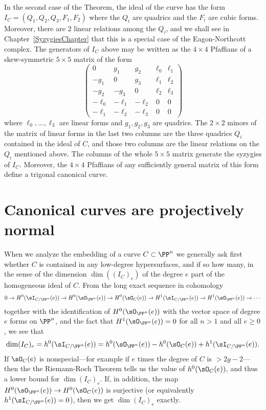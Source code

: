 \begin{fact}
In the second case of the Theorem, the ideal of the curve has the form $I_C = (Q_1, Q_2, Q_3, F_1, F_2)$ 
where the $Q_i$ are quadrics and the $F_i$ are cubic forms. Moreover, there are 2 linear relations among the
$Q_i$, and we shall see in Chapter~\ref{SyzygiesChapter} that this is a special case of the Eagon-Northcott
complex. The generators of $I_C$ above may be written as the $4\times 4$ Pfaffians
of a skew-symmetric $5\times 5$ matrix of the form
$$
\begin{pmatrix}
0&g_1&g_2&\ell_0&\ell_1\\
-g_1&0&g_3&\ell_1&\ell_2\\
-g_2&-g_3&0 &\ell_2&\ell_3\\
-\ell_0&-\ell_1&-\ell_2&0&0\\
-\ell_1&-\ell_2&-\ell_3&0&0
\end{pmatrix}
$$
where $\ell_0,\dots,\ell_3$ are linear forms and $g_1, g_2, g_3$ are quadrics. The
 $2\times 2$
minors of the matrix of linear forms in the last two columns are the three quadrics $Q_i$ contained in the ideal
of $C$, and those two columns are the linear relations on the $Q_i$ mentioned above.
The columns of the whole $5\times 5$ matrix generate the syzygies of $I_C$. Moreover, the
$4\times 4$ Pfaffians of any sufficiently general matrix of this form define a trigonal canonical curve.
\end{fact}


\section{Canonical curves are projectively normal}\label{Noether theorem section}

When we analyze the embedding of a curve $C\subset \PP^n$ we generally ask first whether $C$ is contained in any low-degree
hypersurfaces, and if so how many, in the sense of the dimension $\dim((I_C)_e)$ of the degree $e$ part of the homogeneous ideal of $C$.
From the long exact sequence in cohomology
$$
0\to H^0(\sI_{C/\PP^n}(e)) \to H^0(\sO_{\PP^n}(e)) \to H^0(\sO_C(e)) \to H^1(\sI_{C/\PP^n}(e)) \to H^1(\sO_{\PP^n}(e)) \to\cdots
$$
together with the identification of $H^0(\sO_{\PP^n}(e))$ with the vector space of degree $e$ forms on $\PP^n$, and  the fact that
 $H^1(\sO_{\PP^n}(e)) = 0$ for all $n>1$ and all $e\geq 0$, we see that
 $$
 \dim (I_C)_e = h^0(\sI_{C/\PP^n}(e)) = h^0(\sO_{\PP^n}(e)) - h^0(\sO_C(e)) + h^1(\sI_{C/\PP^n}(e)).
$$
If $\sO_C(e)$ is nonspecial---for example if $e$ times the degree of $C$ is $>2g-2$---then the the Riemann-Roch Theorem tells us the value of
 $h^0(\sO_C(e))$, and thus a lower bound for $ \dim (I_C)_e$. If, in addition, the map
 $H^0(\sO_{\PP^n}(e)) \to H^0(\sO_C(e))$ is surjective (or equivalently $h^1(\sI_{C/\PP^n}(e))=0$),
 then we get $ \dim (I_C)_e$ exactly.
 
